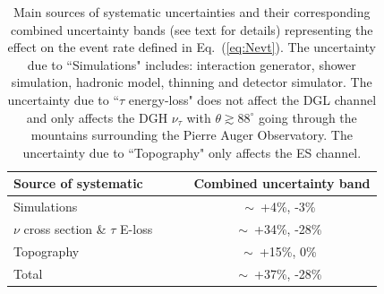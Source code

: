 \documentclass[reprint,showpacs,showkeys,amsmath,amssymb,aps,nofootinbib]{revtex4-1}
\begin{document}
\begin{table}[!t]
\begin{center}
\renewcommand{\arraystretch}{1.3}
\begin{tabular}{ l c }
\hline
 Source of  systematic                    & ~~~~Combined uncertainty band    \\
\hline
 Simulations                              & ~~~~$\sim$~+4\%, -3\%               \\

 $\nu$ cross section \& $\tau$ E-loss     & ~~~~$\sim$~+34\%, -28\%                                 \\

 Topography      	                  & ~~~~$\sim$~+15\%, 0\%                 \\

\hline

 Total                                    & ~~~~$\sim$~+37\%, -28\%             \\

\hline
\end{tabular}
\end{center}
\vskip -3mm
\caption{
Main sources of systematic uncertainties and their
corresponding combined uncertainty bands (see text for details)
representing the effect on the event rate defined in Eq.~(\ref{eq:Nevt}).  
The uncertainty due to ``Simulations" includes: interaction generator, shower simulation, hadronic model, 
thinning and detector simulator.
The uncertainty due to ``$\tau$ energy-loss" does not affect the DGL channel
and only affects the DGH $\nu_\tau$ with $\theta\gtrsim 88^\circ$ going through 
the mountains surrounding the Pierre Auger Observatory. 
The uncertainty due to ``Topography" only affects the ES channel. 
}
\label{tab:sys}
\end{table}
\end{document}
